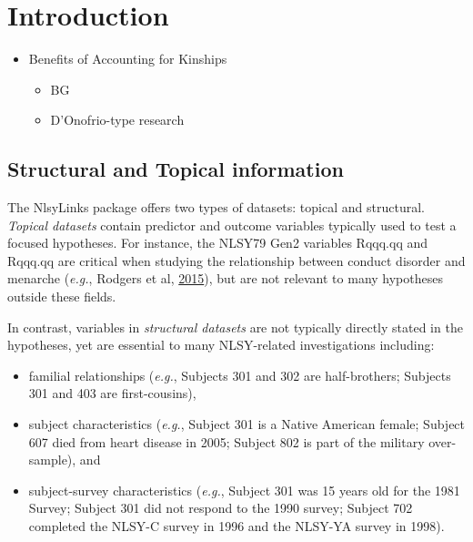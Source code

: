 \documentclass[smallextended]{svjour3}       %
\providecommand{\tightlist}{%
  \setlength{\itemsep}{0pt}\setlength{\parskip}{0pt}}
\begin{document}
\def\spacingset#1{\renewcommand{\baselinestretch}%
{#1}\small\normalsize} \spacingset{1}


\hypertarget{intro}{%
\section{Introduction}\label{intro}}

\begin{itemize}
\tightlist
\item
  Benefits of Accounting for Kinships

  \begin{itemize}
  \tightlist
  \item
    BG
  \item
    D'Onofrio-type research
  \end{itemize}
\end{itemize}

\hypertarget{structural-and-topical-information}{%
\subsection{Structural and Topical
information}\label{structural-and-topical-information}}

The NlsyLinks package offers two types of datasets: topical and
structural. \emph{Topical datasets} contain predictor and outcome
variables typically used to test a focused hypotheses. For instance, the
NLSY79 Gen2 variables Rqqq.qq and Rqqq.qq are critical when studying the
relationship between conduct disorder and menarche (\emph{e.g.}, Rodgers
et al,
\href{https://link.springer.com/article/10.1007/s10519-014-9676-4}{2015}),
but are not relevant to many hypotheses outside these fields.

In contrast, variables in \emph{structural datasets} are not typically
directly stated in the hypotheses, yet are essential to many
NLSY-related investigations including:

\begin{itemize}
\tightlist
\item
  familial relationships (\emph{e.g.}, Subjects 301 and 302 are
  half-brothers; Subjects 301 and 403 are first-cousins),
\item
  subject characteristics (\emph{e.g.}, Subject 301 is a Native American
  female; Subject 607 died from heart disease in 2005; Subject 802 is
  part of the military over-sample), and
\item
  subject-survey characteristics (\emph{e.g.}, Subject 301 was 15 years
  old for the 1981 Survey; Subject 301 did not respond to the 1990
  survey; Subject 702 completed the NLSY-C survey in 1996 and the
  NLSY-YA survey in 1998).
\end{itemize}
\end{document}
